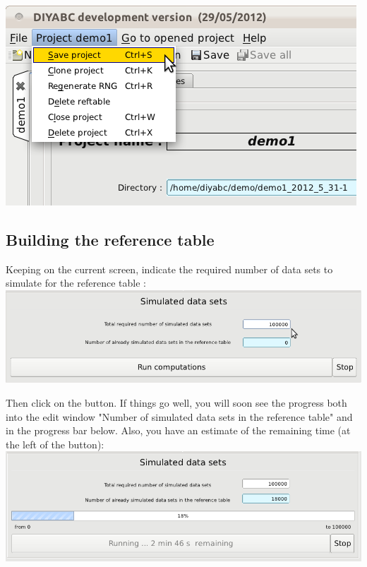 \includegraphics[scale=0.35]{gui_pictures/Capture-DIYABC-23.png} 

\subsection{Building the reference table}

Keeping on the current screen, indicate the required number of data sets to simulate for the reference table : \\ 

\includegraphics[scale=0.35]{gui_pictures/Capture-DIYABC-24.png} 


Then click on the  button. If things go well, you will soon see the progress both into the edit window "Number of simulated data sets in the reference table" and in the progress bar below. Also, you have an estimate of the remaining time (at the left of the   button):\\

\includegraphics[scale=0.35]{gui_pictures/Capture-DIYABC-25.png} 


